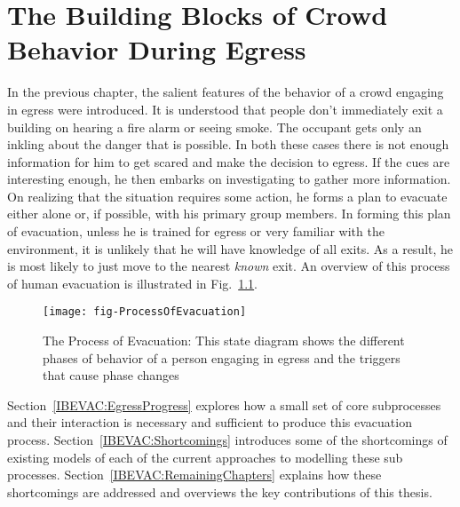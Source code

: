 
\chapter{The Building Blocks of Crowd Behavior During Egress}
\label{chapter:IBEVAC}

In the previous chapter, the salient features of the behavior of a crowd engaging in egress were introduced. It is understood that people don't immediately exit a building on hearing a fire alarm or seeing smoke. The occupant gets only an inkling about the danger that is possible. In both these cases there is not enough information for him to get scared and make the decision to egress. If the cues are interesting enough, he then embarks on investigating to gather more information. On realizing that the situation requires some action, he forms a plan to evacuate either alone or, if possible, with his primary group members. In forming this plan of evacuation, unless he is trained for egress or very familiar with the environment, it is unlikely that he will have knowledge of all exits. As a result, he is most likely to just move to the nearest \emph{known} exit. An overview of this process of human evacuation is illustrated in Fig.~\ref{fig:EvacuationProcess}.

\begin{figure}[!htb]
\centering
\texttt{[image: fig-ProcessOfEvacuation]}
\caption[The Process of Evacuation]{The Process of Evacuation: This state diagram shows the different phases of behavior of a person engaging in egress and the triggers that cause phase changes}
\label{fig:EvacuationProcess}
\end{figure}


Section~\ref{IBEVAC:EgressProgress} explores how a small set of core subprocesses and their interaction is necessary and sufficient to produce this evacuation process. Section~\ref{IBEVAC:Shortcomings} introduces some of the shortcomings of existing models of each of the current approaches to modelling these sub processes. Section~\ref{IBEVAC:RemainingChapters} explains how these shortcomings are addressed and overviews the key contributions of this thesis.





